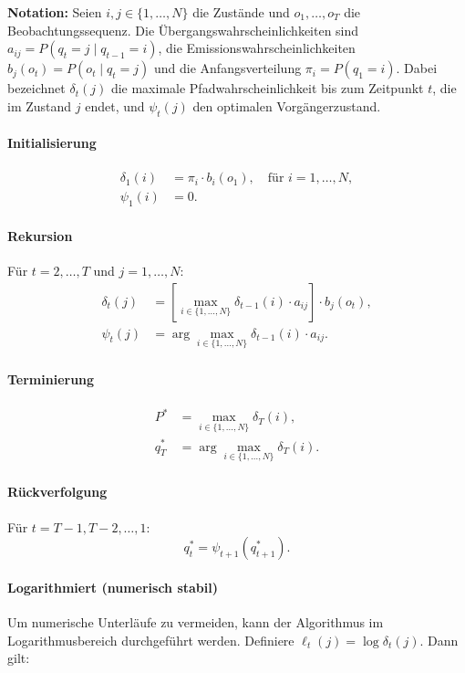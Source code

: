 \medskip
\textbf{Notation:} 
Seien $i, j \in \{1, \ldots, N\}$ die Zustände und $o_1, \ldots, o_T$ die Beobachtungssequenz.
Die Übergangswahrscheinlichkeiten sind $a_{ij} = P(q_t = j \mid q_{t-1} = i)$, 
die Emissionswahrscheinlichkeiten $b_j(o_t) = P(o_t \mid q_t = j)$ und 
die Anfangsverteilung $\pi_i = P(q_1 = i)$.
Dabei bezeichnet $\delta_t(j)$ die maximale Pfadwahrscheinlichkeit bis zum Zeitpunkt $t$, die im Zustand $j$ endet, 
und $\psi_t(j)$ den optimalen Vorgängerzustand.

\paragraph{Initialisierung}
\begin{align}
  \delta_1(i) &= \pi_i \cdot b_i(o_1), \quad \text{für } i = 1, \ldots, N, \\
  \psi_1(i)   &= 0.
\end{align}

\paragraph{Rekursion}
Für $t = 2, \ldots, T$ und $j = 1, \ldots, N$:
\begin{align}
  \delta_t(j) &= \left[\max_{i \in \{1, \ldots, N\}} \delta_{t-1}(i) \cdot a_{ij} \right] \cdot b_j(o_t), \\
  \psi_t(j)   &= \arg\max_{i \in \{1, \ldots, N\}} \delta_{t-1}(i) \cdot a_{ij}.
\end{align}

\paragraph{Terminierung}
\begin{align}
  P^* &= \max_{i \in \{1, \ldots, N\}} \delta_T(i), \\
  q_T^* &= \arg\max_{i \in \{1, \ldots, N\}} \delta_T(i).
\end{align}

\paragraph{Rückverfolgung}
Für $t = T-1, T-2, \ldots, 1$:
\begin{equation}
  q_t^* = \psi_{t+1}(q_{t+1}^*).
\end{equation}

\paragraph{Logarithmiert (numerisch stabil)}
Um numerische Unterläufe zu vermeiden, kann der Algorithmus im Logarithmusbereich durchgeführt werden.
Definiere $\ell_t(j) = \log \delta_t(j)$. Dann gilt:

